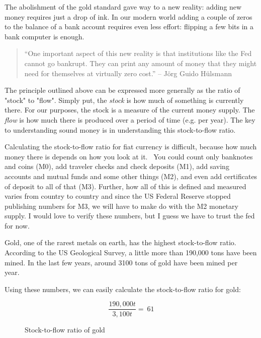 The abolishment of the gold standard gave way to a new reality: adding
new money requires just a drop of ink. In our modern world adding a
couple of zeros to the balance of a bank account requires even less
effort: flipping a few bits in a bank computer is enough.

\begin{quotation}
``One important aspect of this new reality is that institutions like
the Fed cannot go bankrupt. They can print any amount of money that
they might need for themselves at virtually zero cost.''
\flushright -- Jörg Guido Hülsmann
\end{quotation}

The principle outlined above can be expressed more generally as the
ratio of "stock" to "flow". Simply put, the \textit{stock} is how much of
something is currently there. For our purposes, the stock is a measure
of the current money supply. The \textit{flow} is how much there is produced
over a period of time (e.g. per year). The key to understanding sound
money is in understanding this stock-to-flow ratio.

Calculating the stock-to-flow ratio for fiat currency is difficult, because how
much money there is depends on how you look at it.~\cite{wiki:money-supply} You
could count only banknotes and coins (M0), add traveler checks and check
deposits (M1), add saving accounts and mutual funds and some other things (M2),
and even add certificates of deposit to all of that (M3). Further, how all of
this is defined and measured varies from country to country and since the US
Federal Reserve stopped publishing \cite{web:fed-m3} numbers for M3, we will
have to make do with the M2 monetary supply. I would love to verify these
numbers, but I guess we have to trust the fed for now.

Gold, one of the rarest metals on earth, has the highest stock-to-flow
ratio. According to the US Geological Survey, a little more than 190,000
tons have been mined. In the last few years, around 3100 tons of gold
have been mined per year.~\cite{mineral-commodity-summaries}

Using these numbers, we can easily calculate the stock-to-flow ratio for
gold:

\begin{figure}
  \centering
  \begin{equation}
  \frac{190,000 t}{3,100 t} = ~ 61
  \end{equation}
  \caption{Stock-to-flow ratio of gold}
  \label{fig:stock-to-flow-gold}
\end{figure}

